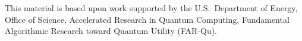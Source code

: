 \documentclass[
    reprint,
    amsmath,amssymb,
    aps,
    pra,  %
    superscriptaddress,
    floatfix
]{revtex4-2}
\theoremstyle{aps}
\begin{document}
\maketitle

















\begin{acknowledgments}
	This material is based upon work supported by the U.S.\
	Department of Energy, Office of Science, Accelerated Research
	in Quantum Computing, Fundamental Algorithmic Research toward
	Quantum Utility (FAR-Qu).
\end{acknowledgments}




\end{document}
